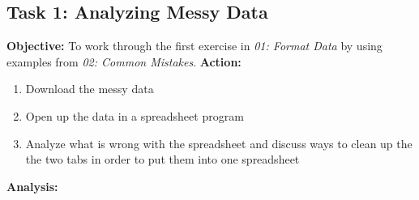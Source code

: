 \documentclass{article}
\begin{document}
\subsection{Task 1: Analyzing Messy Data}
\textbf{Objective:} To work through the first exercise in \textit{01: Format Data} by using examples from \textit{02: Common Mistakes}.
\newline
\textbf{Action:}
\begin{enumerate}
    \item Download the messy data
    \item Open up the data in a spreadsheet program
    \item Analyze what is wrong with the spreadsheet and discuss ways to clean up the the two tabs in order to put them into one spreadsheet
\end{enumerate}
\textbf{Analysis:}
\end{document}
